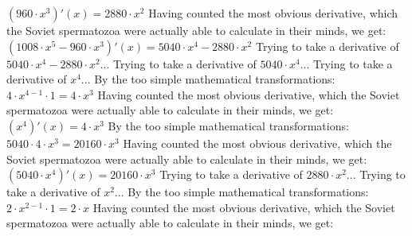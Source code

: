 \documentclass[a4paper, 12pt]{article}
\begin{document}
$({{960} \cdot {{x} ^ {3}}})'(x) = {{2880} \cdot {{x} ^ {2}}}$\newline
\newline
Having counted the most obvious derivative, which the Soviet spermatozoa were actually able to calculate in their minds, we get:
$({{{1008} \cdot {{x} ^ {5}}} - {{960} \cdot {{x} ^ {3}}}})'(x) = {{{5040} \cdot {{x} ^ {4}}} - {{2880} \cdot {{x} ^ {2}}}}$\newline
\newline
Trying to take a derivative of ${{{5040} \cdot {{x} ^ {4}}} - {{2880} \cdot {{x} ^ {2}}}}$...\newline
\newline
Trying to take a derivative of ${{5040} \cdot {{x} ^ {4}}}$...\newline
\newline
Trying to take a derivative of ${{x} ^ {4}}$...\newline
\newline
By the too simple mathematical transformations:
 ${{{4} \cdot {{x} ^ {{4} - {1}}}} \cdot {1}} = {{4} \cdot {{x} ^ {3}}}$ 
 \newline
 \newline 
Having counted the most obvious derivative, which the Soviet spermatozoa were actually able to calculate in their minds, we get:
$({{x} ^ {4}})'(x) = {{4} \cdot {{x} ^ {3}}}$\newline
\newline
By the too simple mathematical transformations:
 ${{5040} \cdot {{4} \cdot {{x} ^ {3}}}} = {{20160} \cdot {{x} ^ {3}}}$ 
 \newline
 \newline 
Having counted the most obvious derivative, which the Soviet spermatozoa were actually able to calculate in their minds, we get:
$({{5040} \cdot {{x} ^ {4}}})'(x) = {{20160} \cdot {{x} ^ {3}}}$\newline
\newline
Trying to take a derivative of ${{2880} \cdot {{x} ^ {2}}}$...\newline
\newline
Trying to take a derivative of ${{x} ^ {2}}$...\newline
\newline
By the too simple mathematical transformations:
 ${{{2} \cdot {{x} ^ {{2} - {1}}}} \cdot {1}} = {{2} \cdot {x}}$ 
 \newline
 \newline 
Having counted the most obvious derivative, which the Soviet spermatozoa were actually able to calculate in their minds, we get:
\end{document}

